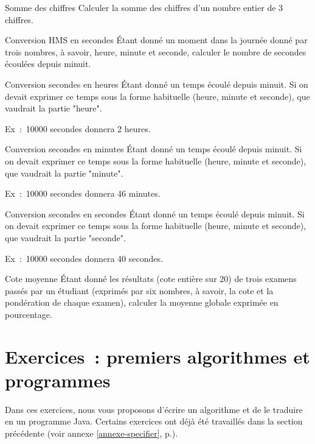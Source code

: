 \begin{Exercice}{Somme des chiffres}
	Calculer la somme des chiffres
	d’un nombre entier de 3 chiffres.
\end{Exercice}

\begin{Exercice}{Conversion HMS en secondes}
	Étant donné un moment dans la journée donné
	par trois nombres, à savoir, heure, minute et seconde, calculer le
	nombre de secondes écoulées depuis minuit.
\end{Exercice}

\begin{Exercice}{Conversion secondes en heures}
	Étant donné un temps écoulé depuis minuit.
	Si on devait exprimer ce temps sous la forme
	habituelle (heure, minute et seconde),
	que vaudrait la partie "heure".

	Ex~:~10000 secondes donnera 2 heures.
\end{Exercice}

\begin{Exercice}{Conversion secondes en minutes}
	Étant donné un temps écoulé depuis minuit.
	Si on devait exprimer ce temps sous la forme
	habituelle (heure, minute et seconde),
	que vaudrait la partie "minute".

	Ex~:~10000 secondes donnera 46 minutes.
\end{Exercice}

\begin{Exercice}{Conversion secondes en secondes}
	Étant donné un temps écoulé depuis minuit.
	Si on devait exprimer ce temps sous la forme
	habituelle (heure, minute et seconde),
	que vaudrait la partie "seconde".

	Ex~:~10000 secondes donnera 40 secondes.
\end{Exercice}	

\begin{Exercice}{Cote moyenne}
	Étant donné les résultats (cote entière sur
	20) de trois examens passés par un étudiant (exprimés par six nombres,
	à savoir, la cote et la pondération de chaque examen), calculer 
	la moyenne globale exprimée en pourcentage.
\end{Exercice}


\clearpage
\section{Exercices~: premiers algorithmes et programmes}
\label{prem-ex-simple}

Dans ces exercices, nous vous proposons d'écrire un algorithme et de le traduire
en un programme Java. Certains exercices ont déjà été travaillés dans la section 
précédente (voir annexe \ref{annexe-specifier}, p.\pageref{annexe-specifier}).

